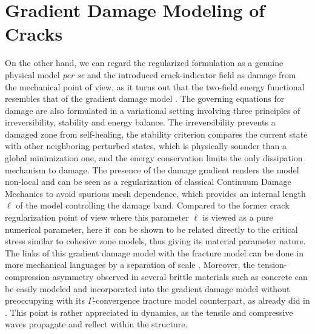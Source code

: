 \section{Gradient Damage Modeling of Cracks} \label{sec:graddamage}
On the other hand, we can regard the regularized formulation as a genuine physical model \emph{per se} and the introduced crack-indicator field as damage from the mechanical point of view, as it turns out that the two-field energy functional resembles that of the gradient damage model \cite{PhamMarigo:2010,PhamMarigo:2010-1,PhamAmorMarigoMaurini:2011,SicsicMarigoMaurini:2013}. The governing equations for damage are also formulated in a variational setting involving three principles of irreversibility, stability and energy balance. The irreversibility prevents a damaged zone from self-healing, the stability criterion compares the current state with other neighboring perturbed states, which is physically sounder than a global minimization one, and the energy conservation limits the only dissipation mechanism to damage. The presence of the damage gradient renders the model non-local and can be seen as a regularization of classical Continuum Damage Mechanics to avoid spurious mesh dependence, which provides an internal length $\ell$ of the model controlling the damage band. Compared to the former crack regularization point of view where this parameter $\ell$ is viewed as a pure numerical parameter, here it can be shown to be related directly to the critical stress similar to cohesive zone models, thus giving its material parameter nature. The links of this gradient damage model with the fracture model can be done in more mechanical languages by a separation of scale \cite{SicsicMarigo:2013,LorentzCuvilliezKazymyrenko:2011,LorentzCuvilliezKazymyrenko:2012}. Moreover, the tension-compression asymmetry observed in several brittle materials such as concrete can be easily modeled and incorporated into the gradient damage model without preoccupying with its $\Gamma$-convergence fracture model counterpart, as already did in \cite{AmorMarigoMaurini:2009,FreddiRoyer-Carfagni:2010,LancioniRoyer-Carfagni:2009}. This point is rather appreciated in dynamics, as the tensile and compressive waves propagate and reflect within the structure.

